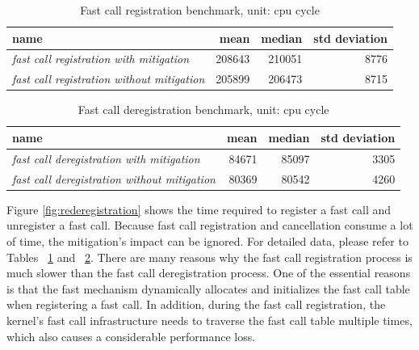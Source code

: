 \begin{table}[htp]
  \centering
  \begin{tabular}{lrrr}
    \textbf{name} & \textbf{mean} & \textbf{median} & \textbf{std deviation} \\
    \hline
    \textit{fast call registration with mitigation} & 208643 & 210051 & 8776\\
    \textit{fast call registration without mitigation} & 205899 & 206473 & 8715\\


    

  \end{tabular}
  \caption[Fast call registration benchmark]{Fast call registration benchmark, unit: cpu cycle}
  \label{tab:number2}
\end{table}


\begin{table}[htp]
  \centering
  \begin{tabular}{lrrr}
    \textbf{name} & \textbf{mean} & \textbf{median} & \textbf{std deviation} \\
    \hline
    \textit{fast call deregistration with mitigation} &84671 & 85097 & 3305\\
    \textit{fast call deregistration without mitigation} &80369 & 80542 & 4260\\

  \end{tabular}
  \caption[Fast call deregistration benchmark]{Fast call deregistration benchmark, unit: cpu cycle}
  \label{tab:number3}
\end{table}


Figure \ref{fig:rederegistration} shows the time required to register a fast call 
and unregister a fast call. Because fast call registration 
and cancellation consume a lot of time, the mitigation's impact 
can be ignored. For detailed data, please refer to Tables ~\ref{tab:number2} and ~\ref{tab:number3}. 
There are many reasons why the fast call registration process is much 
slower than the fast call deregistration process. One of the essential 
reasons is that the fast mechanism dynamically allocates and initializes the fast call table 
when registering a fast call. In addition, during the fast call registration, 
the kernel's fast call infrastructure needs to traverse the fast call table 
multiple times, which also causes a considerable performance loss.


